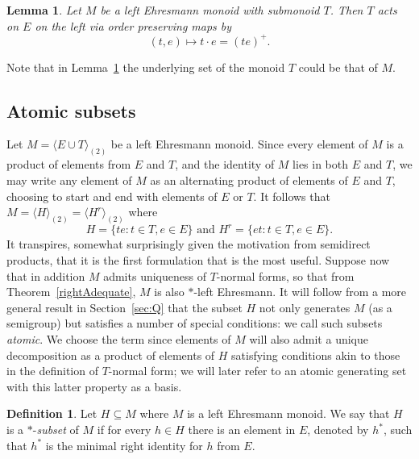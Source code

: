 \documentclass[12pt]{amsart}
\newtheorem{lem}[them]{Lemma}
\theoremstyle{definition}
\newtheorem{defn}[them]{Definition}
\theoremstyle{definition}
\numberwithin{them}{section}
\numberwithin{equation}{section}
\begin{document}
\begin{lem}\label{lem:naturalaction}   Let $M$ be a left Ehresmann monoid with submonoid $T$. Then $T$ acts on $E$ on the left via order
preserving maps by
\[(t, e)\mapsto t \cdot e = (te)^+.\] \end{lem}
Note that in Lemma~\ref{lem:naturalaction}  the underlying set of the monoid $T$ could be that of $M$.

\subsection{Atomic subsets}


Let $M = \langle E \cup T \rangle_{(2)}$ be a left Ehresmann monoid. Since every element of $M$ is a product of elements from $E$ and $T$, and  the identity of $M$ lies in  both $E$ and $T$, we may write any element of $M$ as an alternating product of elements of $E$ and $T$, choosing to start and end with elements of $E$ or $T$. It follows that  $M=\langle H\rangle_{(2)}=\langle H^r\rangle_{(2)}$
where 
\[H=\{te: t \in T, e \in E\} \mbox{ and }H^r=\{et: t \in T, e \in E\}. \] 
It transpires, somewhat surprisingly given the motivation from semidirect products, that it is the first formulation that is the most useful. Suppose now that in addition $M$  admits uniqueness of $T$-normal forms, so that from Theorem~\ref{rightAdequate}, $M$ is also $*$-left Ehresmann. 
It will follow from a more general result in Section~\ref{sec:Q} that the subset $H$ not only generates $M$ (as a semigroup) but satisfies a number of special conditions: we call such subsets {\em atomic}. We choose the term since elements of $M$ will also admit a unique decomposition as a product of elements of $H$ satisfying conditions akin to those in the definition of $T$-normal form;  we will later refer to an atomic generating set with this latter property as a basis.


\begin{defn}\label{*-subset} Let $H\subseteq M$ where $M$ is a left Ehresmann  monoid.  We say that  $H$ is a $*$-{\it subset} of $M$ if  for every $h\in H$ there is an element in $E$, denoted by $h^*$, such that $h^*$ is the minimal right identity for $h$ from $E$.
\end{defn}
\end{document}
